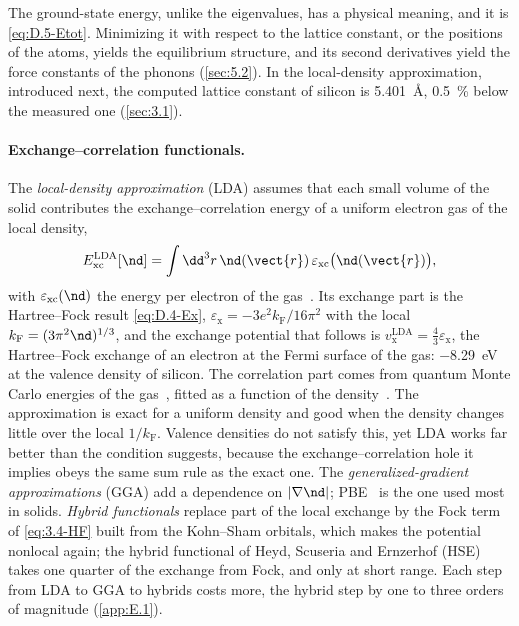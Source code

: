 The ground-state energy, unlike the eigenvalues, has a physical meaning, and it is \cref{eq:D.5-Etot}. Minimizing it with respect to the lattice constant, or the positions of the atoms, yields the equilibrium structure, and its second derivatives yield the force constants of the phonons (\cref{sec:5.2}). In the local-density approximation, introduced next, the computed lattice constant of silicon is \SI{5.401}{\angstrom}, \SI{0.5}{\percent} below the measured one (\cref{sec:3.1}).

\paragraph{Exchange--correlation functionals.}
The \emph{local-density approximation} (LDA) assumes that each small volume of the solid contributes the exchange--correlation energy of a uniform electron gas of the local density,
\begin{equation}
  E_{\mathrm{xc}}^{\mathrm{LDA}}[\nd] = \int\dd^3r\,\nd(\vect{r})\,\varepsilon_{\mathrm{xc}}\bigl(\nd(\vect{r})\bigr) ,
  \label{eq:3.4-LDA}
\end{equation}
with $\varepsilon_{\mathrm{xc}}(\nd)$ the energy per electron of the gas~\cite{kohn1965self}. Its exchange part is the Hartree--Fock result \cref{eq:D.4-Ex}, $\varepsilon_{\mathrm{x}} = -3e^2k_{\mathrm{F}}/16\pi^2$ with the local $k_{\mathrm{F}} = (3\pi^2\nd)^{1/3}$, and the exchange potential that follows is $v_{\mathrm{x}}^{\mathrm{LDA}} = \tfrac43\varepsilon_{\mathrm{x}}$, the Hartree--Fock exchange of an electron at the Fermi surface of the gas: \SI{-8.29}{eV} at the valence density of silicon. The correlation part comes from quantum Monte Carlo energies of the gas~\cite{ceperley1980ground}, fitted as a function of the density~\cite{perdew1981self}. The approximation is exact for a uniform density and good when the density changes little over the local $1/k_{\mathrm{F}}$. Valence densities do not satisfy this, yet LDA works far better than the condition suggests, because the exchange--correlation hole it implies obeys the same sum rule as the exact one. The \emph{generalized-gradient approximations} (GGA) add a dependence on $|\nabla\nd|$; PBE~\cite{perdew1996generalized} is the one used most in solids. \emph{Hybrid functionals} replace part of the local exchange by the Fock term of \cref{eq:3.4-HF} built from the Kohn--Sham orbitals, which makes the potential nonlocal again; the hybrid functional of Heyd, Scuseria and Ernzerhof (HSE)~\cite{heyd2003hybrid} takes one quarter of the exchange from Fock, and only at short range. Each step from LDA to GGA to hybrids costs more, the hybrid step by one to three orders of magnitude (\cref{app:E.1}).

